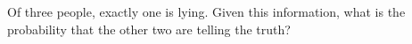 Of three people, exactly one is lying. Given this information, what is the probability that the other two are telling the truth?
